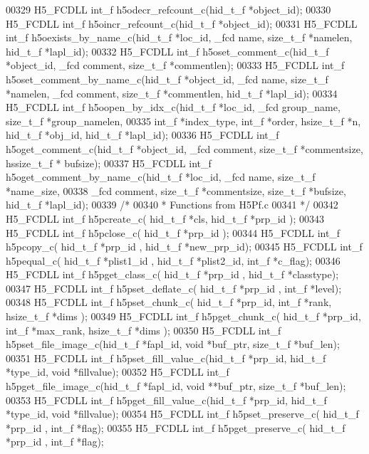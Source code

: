 \begin{DoxyCode}
00329 H5\_FCDLL int\_f h5odecr\_refcount\_c(hid\_t\_f *object\_id);
00330 H5\_FCDLL int\_f h5oincr\_refcount\_c(hid\_t\_f *object\_id);
00331 H5\_FCDLL int\_f h5oexists\_by\_name\_c(hid\_t\_f *loc\_id, \_fcd name, size\_t\_f *namelen, hid\_t\_f *lapl\_id);
00332 H5\_FCDLL int\_f h5oset\_comment\_c(hid\_t\_f *object\_id, \_fcd comment, size\_t\_f *commentlen);
00333 H5\_FCDLL int\_f h5oset\_comment\_by\_name\_c(hid\_t\_f *object\_id, \_fcd name, size\_t\_f *namelen,  \_fcd comment, 
      size\_t\_f *commentlen, hid\_t\_f *lapl\_id);
00334 H5\_FCDLL int\_f h5oopen\_by\_idx\_c(hid\_t\_f *loc\_id, \_fcd  group\_name, size\_t\_f *group\_namelen, 
00335                       int\_f *index\_type, int\_f *order, hsize\_t\_f *n, hid\_t\_f *obj\_id, hid\_t\_f *lapl\_id);
00336 H5\_FCDLL int\_f h5oget\_comment\_c(hid\_t\_f *object\_id, \_fcd comment, size\_t\_f *commentsize, hssize\_t\_f *
      bufsize);
00337 H5\_FCDLL int\_f h5oget\_comment\_by\_name\_c(hid\_t\_f *loc\_id, \_fcd name, size\_t\_f *name\_size, 
00338                       \_fcd comment, size\_t\_f *commentsize, size\_t\_f *bufsize, hid\_t\_f *lapl\_id);
00339 \textcolor{comment}{/*}
00340 \textcolor{comment}{ * Functions from H5Pf.c}
00341 \textcolor{comment}{ */}
00342 H5\_FCDLL int\_f h5pcreate\_c( hid\_t\_f *cls, hid\_t\_f *prp\_id );
00343 H5\_FCDLL int\_f h5pclose\_c( hid\_t\_f *prp\_id );
00344 H5\_FCDLL int\_f h5pcopy\_c( hid\_t\_f *prp\_id , hid\_t\_f *new\_prp\_id);
00345 H5\_FCDLL int\_f h5pequal\_c( hid\_t\_f *plist1\_id , hid\_t\_f *plist2\_id, int\_f *c\_flag);
00346 H5\_FCDLL int\_f h5pget\_class\_c( hid\_t\_f *prp\_id , hid\_t\_f *classtype);
00347 H5\_FCDLL int\_f h5pset\_deflate\_c( hid\_t\_f *prp\_id , int\_f *level);
00348 H5\_FCDLL int\_f h5pset\_chunk\_c( hid\_t\_f *prp\_id, int\_f *rank, hsize\_t\_f *dims );
00349 H5\_FCDLL int\_f h5pget\_chunk\_c( hid\_t\_f *prp\_id, int\_f *max\_rank, hsize\_t\_f *dims );
00350 H5\_FCDLL int\_f h5pset\_file\_image\_c(hid\_t\_f *fapl\_id, \textcolor{keywordtype}{void} *buf\_ptr, size\_t\_f *buf\_len);
00351 H5\_FCDLL int\_f h5pset\_fill\_value\_c(hid\_t\_f *prp\_id, hid\_t\_f *type\_id, \textcolor{keywordtype}{void} *fillvalue);
00352 H5\_FCDLL int\_f h5pget\_file\_image\_c(hid\_t\_f *fapl\_id, \textcolor{keywordtype}{void} **buf\_ptr, size\_t\_f *buf\_len);
00353 H5\_FCDLL int\_f h5pget\_fill\_value\_c(hid\_t\_f *prp\_id, hid\_t\_f *type\_id, \textcolor{keywordtype}{void} *fillvalue);
00354 H5\_FCDLL int\_f h5pset\_preserve\_c( hid\_t\_f *prp\_id , int\_f *flag);
00355 H5\_FCDLL int\_f h5pget\_preserve\_c( hid\_t\_f *prp\_id , int\_f *flag);

\end{DoxyCode}
